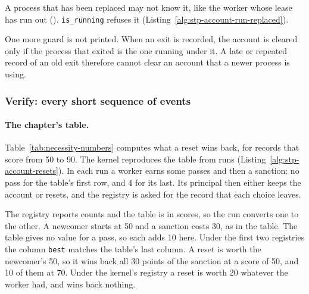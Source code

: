 
A process that has been replaced may not know it, like the worker whose
lease has run out (). \texttt{is\_running}
refuses it (Listing~\ref{alg:stp-account-run-replaced}).


One more guard is not printed. When an exit is recorded, the account is
cleared only if the process that exited is the one running under it. A
late or repeated record of an old exit therefore cannot clear an account
that a newer process is using.


\subsubsection{Verify: every short sequence of events}

\paragraph{The chapter's table.}
Table~\ref{tab:necessity-numbers} computes what a reset
wins back, for records that score from 50 to 90. The kernel reproduces
the table from runs (Listing~\ref{alg:stp-account-resets}). In each run
a worker earns some passes and then a sanction: no pass for the table's
first row, and 4 for its last. Its principal then either keeps the
account or resets, and the registry is asked for the record that each
choice leaves.




The registry reports counts and the table is in scores, so the run
converts one to the other. A newcomer starts at 50 and a sanction costs
30, as in the table. The table gives no value for a pass, so each adds 10
here. Under the first two registries the column \texttt{best} matches
the table's last column. A reset is worth the newcomer's 50, so it wins
back all 30 points of the sanction at a score of 50, and 10 of them at
70. Under the kernel's registry a reset is worth 20 whatever the worker
had, and wins back nothing.

